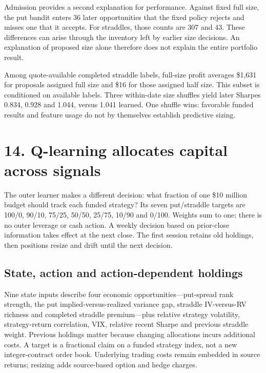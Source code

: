 \documentclass[11pt,letterpaper]{article}
\begin{document}
\begin{center}\small{}\end{center}
Admission provides a second explanation for performance. Against fixed full size, the put bandit enters 36 later opportunities that the fixed policy rejects and misses one that it accepts. For straddles, those counts are 307 and 43. These differences can arise through the inventory left by earlier size decisions. An explanation of proposed size alone therefore does not explain the entire portfolio result.

Among quote-available completed straddle labels, full-size profit averages \$1,631 for proposals assigned full size and \$16 for those assigned half size. This subset is conditioned on available labels. Three within-date size shuffles yield later Sharpes 0.834, 0.928 and 1.044, versus 1.041 learned. One shuffle wins: favorable funded results and feature usage do not by themselves establish predictive sizing.

\clearpage
\section*{14. Q-learning allocates capital across signals}
The outer learner makes a different decision: what fraction of one \$10 million budget should track each funded strategy? Its seven put/straddle targets are 100/0, 90/10, 75/25, 50/50, 25/75, 10/90 and 0/100. Weights sum to one; there is no outer leverage or cash action. A weekly decision based on prior-close information takes effect at the next close. The first session retains old holdings, then positions resize and drift until the next decision.

\subsection*{State, action and action-dependent holdings}
Nine state inputs describe four economic opportunities---put-spread rank strength, the put implied-versus-realized variance gap, straddle IV-versus-RV richness and completed straddle premium---plus relative strategy volatility, strategy-return correlation, VIX, relative recent Sharpe and previous straddle weight. Previous holdings matter because changing allocations incurs additional costs. A target is a fractional claim on a funded strategy index, not a new integer-contract order book. Underlying trading costs remain embedded in source returns; resizing adds source-based option and hedge charges.
\end{document}
